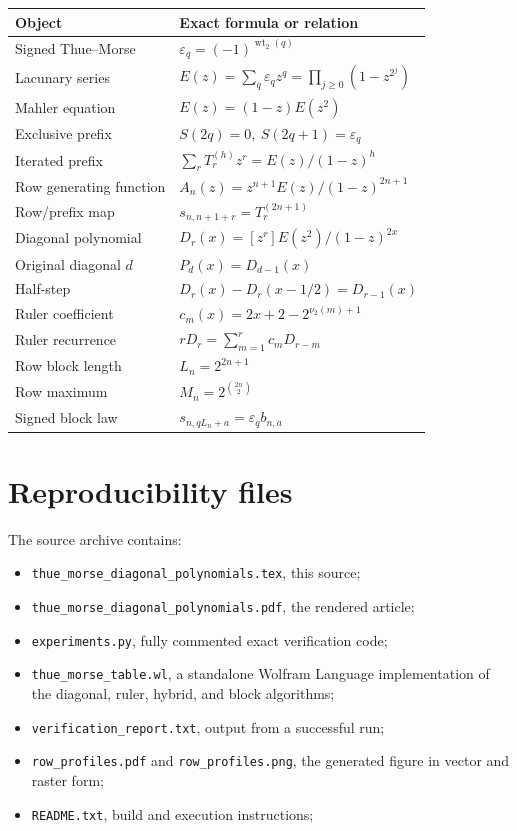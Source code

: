\documentclass[11pt,oneside]{article}
\numberwithin{equation}{section}
\theoremstyle{definition}
\theoremstyle{remark}
\newcommand{\eps}{\varepsilon}
\newcommand{\wt}{\operatorname{wt}_2}
\newcommand{\nuTwo}{\nu_2}
\newcommand{\Diag}{D}
\newcommand{\Prefix}{T}
\begin{document}
\begin{center}
\begin{tabularx}{\textwidth}{@{}p{}X@{}}
\toprule
Object & Exact formula or relation \\
\midrule
Signed Thue--Morse & \(\eps_q=(-1)^{\wt(q)}\) \\
Lacunary series & \(E(z)=\sum_q\eps_qz^q=\prod_{j\ge0}(1-z^{2^j})\) \\
Mahler equation & \(E(z)=(1-z)E(z^2)\) \\
Exclusive prefix & \(S(2q)=0,\ S(2q+1)=\eps_q\) \\
Iterated prefix & \(\sum_r\Prefix_r^{(h)}z^r=E(z)/(1-z)^h\) \\
Row generating function & \(A_n(z)=z^{n+1}E(z)/(1-z)^{2n+1}\) \\
Row/prefix map & \(s_{n,n+1+r}=\Prefix_r^{(2n+1)}\) \\
Diagonal polynomial & \(\Diag_r(x)=[z^r]E(z^2)/(1-z)^{2x}\) \\
Original diagonal \(d\) & \(P_d(x)=\Diag_{d-1}(x)\) \\
Half-step & \(\Diag_r(x)-\Diag_r(x-1/2)=\Diag_{r-1}(x)\) \\
Ruler coefficient & \(c_m(x)=2x+2-2^{\nuTwo(m)+1}\) \\
Ruler recurrence & \(r\Diag_r=\sum_{m=1}^rc_m\Diag_{r-m}\) \\
Row block length & \(L_n=2^{2n+1}\) \\
Row maximum & \(M_n=2^{\binom{2n}{2}}\) \\
Signed block law & \(s_{n,qL_n+a}=\eps_qb_{n,a}\) \\
\bottomrule
\end{tabularx}
\end{center}

\section{Reproducibility files}

The source archive contains:
\begin{itemize}
\item \texttt{thue\_morse\_diagonal\_polynomials.tex}, this source;
\item \texttt{thue\_morse\_diagonal\_polynomials.pdf}, the rendered article;
\item \texttt{experiments.py}, fully commented exact verification code;
\item \texttt{thue\_morse\_table.wl}, a standalone Wolfram Language
implementation of the diagonal, ruler, hybrid, and block algorithms;
\item \texttt{verification\_report.txt}, output from a successful run;
\item \texttt{row\_profiles.pdf} and \texttt{row\_profiles.png}, the generated
figure in vector and raster form;
\item \texttt{README.txt}, build and execution instructions;
\end{itemize}
\end{document}
